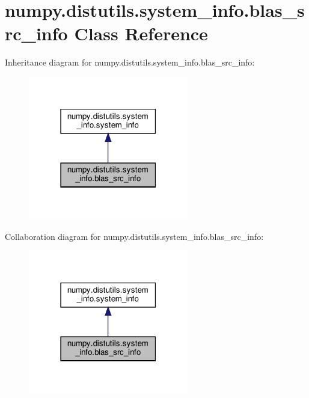 \hypertarget{classnumpy_1_1distutils_1_1system__info_1_1blas__src__info}{}\section{numpy.\+distutils.\+system\+\_\+info.\+blas\+\_\+src\+\_\+info Class Reference}
\label{classnumpy_1_1distutils_1_1system__info_1_1blas__src__info}


Inheritance diagram for numpy.\+distutils.\+system\+\_\+info.\+blas\+\_\+src\+\_\+info\+:
\nopagebreak
\begin{figure}[H]
\begin{center}
\leavevmode
\includegraphics[width=198pt]{classnumpy_1_1distutils_1_1system__info_1_1blas__src__info__inherit__graph}
\end{center}
\end{figure}


Collaboration diagram for numpy.\+distutils.\+system\+\_\+info.\+blas\+\_\+src\+\_\+info\+:
\nopagebreak
\begin{figure}[H]
\begin{center}
\leavevmode
\includegraphics[width=198pt]{classnumpy_1_1distutils_1_1system__info_1_1blas__src__info__coll__graph}
\end{center}
\end{figure}
